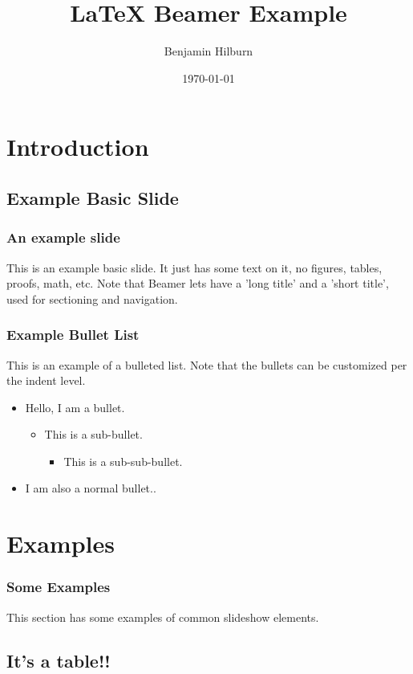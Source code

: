 \documentclass{beamer}
\title{LaTeX Beamer Example}
\author{Benjamin Hilburn}
\institute{Virginia Tech}
\date{\today}
\begin{document}
\frame{\titlepage}

\section[Outline]{}
\frame{\tableofcontents}

\section{Introduction}
\subsection[Basic Slide]{Example Basic Slide}

\frame
{
	\frametitle{An example slide}
	
	This is an example basic slide. It just has some text on it, no figures, tables, proofs, math, etc.  Note that Beamer lets have a 'long title' and a 'short title', used for sectioning and navigation.
}

\frame
{
	\frametitle{Example Bullet List}

	This is an example of a bulleted list. Note that the bullets can be customized per the indent level.
	
	\begin{itemize}
	\item Hello, I am a bullet.
	\begin{itemize}
		\item This is a sub-bullet.
		\begin{itemize}
			\item This is a sub-sub-bullet.
		\end{itemize}
	\end{itemize}
	\vspace{\baselineskip}
	\item I am also a normal bullet..
	\end{itemize}
}

\section{Examples}

\frame
{
	\frametitle{Some Examples}

	This section has some examples of common slideshow elements.
}

\subsection{It's a table!!}
\end{document}
